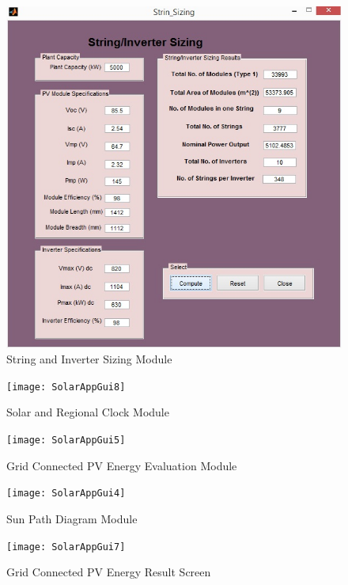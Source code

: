 \documentclass[12pt]{article}
\begin{document}
\begin{figure}[H]
\centering
\includegraphics[scale=0.5]{SolarAppGui3}
\caption{String and Inverter Sizing Module}
\label{figApp1_3} %
\end{figure}

\begin{figure}[H]
\centering
\texttt{[image: SolarAppGui8]}
\caption{Solar and Regional Clock Module}
\label{figApp1_4} %
\end{figure}

\begin{figure}[H]
\centering
\texttt{[image: SolarAppGui5]}
\caption{Grid Connected PV Energy Evaluation Module}
\label{figApp1_5} %
\end{figure}

\begin{figure}[H]
\centering
\texttt{[image: SolarAppGui4]}
\caption{Sun Path Diagram Module}
\label{figApp1_6} %
\end{figure}

\begin{figure}[H]
\centering
\texttt{[image: SolarAppGui7]}
\caption{Grid Connected PV Energy Result Screen}
\label{figApp1_6} %
\end{figure}
\end{document}
